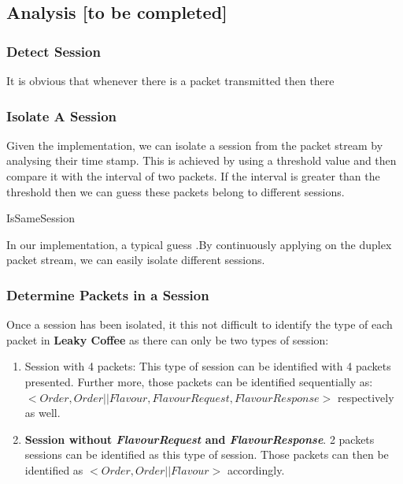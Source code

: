 \subsection{Analysis [to be completed]}

\subsubsection{Detect Session}
It is obvious that whenever there is a packet transmitted then there 

\subsubsection{Isolate A Session}
Given the implementation, we can isolate a session from the packet stream by analysing their time stamp. 
This is achieved by using a threshold value and then compare it with the interval of two packets. If the interval is greater than the threshold then we can guess these packets belong to different sessions.

\begin{algorithm}[H]
{
	 {
		\;
	}
	{
	}
}
\caption{IsSameSession}
\label{1}
\end{algorithm}

In our implementation, a typical guess .By continuously applying  on the duplex packet stream, we can easily isolate different sessions.

\subsubsection{Determine Packets in a Session}
Once a session has been isolated, it this not difficult to identify the type of each packet in \textbf{Leaky Coffee}  as there can only be two types of session:
\begin{enumerate}
\item Session with 4 packets: This type of session can be identified with 4 packets presented. Further more, those packets can be identified sequentially as: $<Order, Order||Flavour, FlavourRequest, FlavourResponse>$ respectively as well.

\item \textbf{Session without \textit{FlavourRequest} and \textit{FlavourResponse}}. 2 packets sessions can be identified as this type of session. Those packets can then be identified as $<Order, Order||Flavour>$ accordingly.
\end{enumerate}

